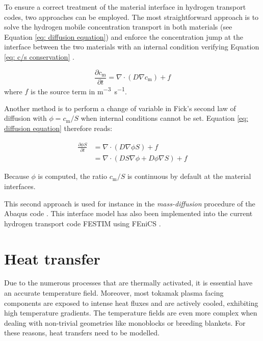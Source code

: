 To ensure a correct treatment of the material interface in hydrogen transport codes, two approaches can be employed.
The most straightforward approach is to solve the hydrogen mobile concentration transport in both materials (see Equation \ref{eq: diffusion equation}) and enforce the concentration jump at the interface between the two materials with an internal condition verifying  Equation \ref{eq: c/s conservation} .

\begin{equation}
    \frac{\partial c_\mathrm{m}}{\partial t}=\nabla \cdot\left(D \nabla c_\mathrm{m}\right) + f
   \label{eq: diffusion equation}
\end{equation}
where $f$ is the source term in \si{m^{-3}.s^{-1}}.

Another method is to perform a change of variable in Fick's second law of diffusion with $\phi = c_\mathrm{m}/S$  when internal conditions cannot be set.
Equation \ref{eq: diffusion equation} therefore reads:

\begin{align}
    \frac{\partial \phi S}{\partial t} &= \nabla \cdot\left(D \nabla \phi S\right) + f \nonumber \\
    &=\nabla \cdot\left( D S \nabla \phi + D \phi \nabla S\right) + f \label{eq: diffusion equation changed}
\end{align}

Because $\phi$ is computed, the ratio $c_\mathrm{m}/S$ is continuous by default at the material interfaces.

This second approach is used for instance in the \textit{mass-diffusion} procedure of the Abaqus code .
This interface model has also been implemented into the current hydrogen transport code FESTIM  using FEniCS .


\section{Heat transfer}
Due to the numerous processes that are thermally activated, it is essential have an accurate temperature field.
Moreover, most tokamak plasma facing components are exposed to intense heat fluxes and are actively cooled, exhibiting high temperature gradients.
The temperature fields are even more complex when dealing with non-trivial geometries like monoblocks or breeding blankets.
For these reasons, heat transfers need to be modelled.

